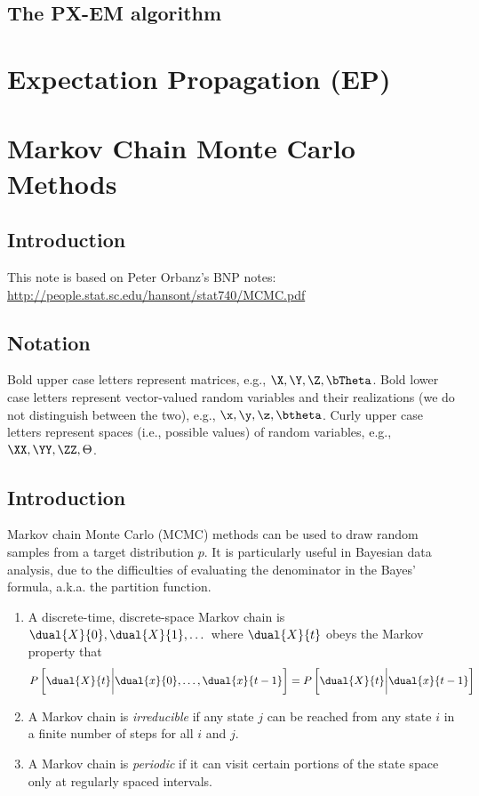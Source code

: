 \documentclass{book}
\begin{document}
\section{The PX-EM algorithm}

\chapter{Expectation Propagation (EP)}


\chapter{Markov Chain Monte Carlo Methods}
\section{Introduction}
This note is based on Peter Orbanz's BNP notes:
\vspace*{5mm}
\\
\url{http://people.stat.sc.edu/hansont/stat740/MCMC.pdf}

\section{Notation}
Bold upper case letters represent matrices, e.g., $\X, \Y, \Z, \bTheta$. Bold lower case letters represent vector-valued random variables and their realizations (we do not distinguish between the two), e.g., $\x, \y, \z, \btheta$. Curly upper case letters represent spaces (i.e., possible values) of random variables, e.g., $\XX, \YY, \ZZ, \Theta$.

\section{Introduction}
Markov chain Monte Carlo (MCMC) methods can be used to draw random samples from a target distribution $p$. It is particularly useful in Bayesian data analysis, due to the difficulties of evaluating the denominator in the Bayes' formula, a.k.a. the partition function.

\begin{enumerate}
\item A discrete-time, discrete-space Markov chain is $\dual{X}{0}, \dual{X}{1}, \dots$ where $\dual{X}{t}$ obeys the Markov property that
\begin{align}
P\left[\dual{X}{t} \bigg| \dual{x}{0},\dots,\dual{x}{t-1}\right] = P\left[\dual{X}{t} \bigg| \dual{x}{t-1} \right]
\end{align}
\item A Markov chain is {\em{irreducible}} if any state $j$ can be reached from any state $i$ in a finite number of steps for all $i$ and $j$.
\item A Markov chain is {\em{periodic}} if it can visit certain portions of the state space only at regularly spaced intervals.
\end{enumerate}
\end{document}
